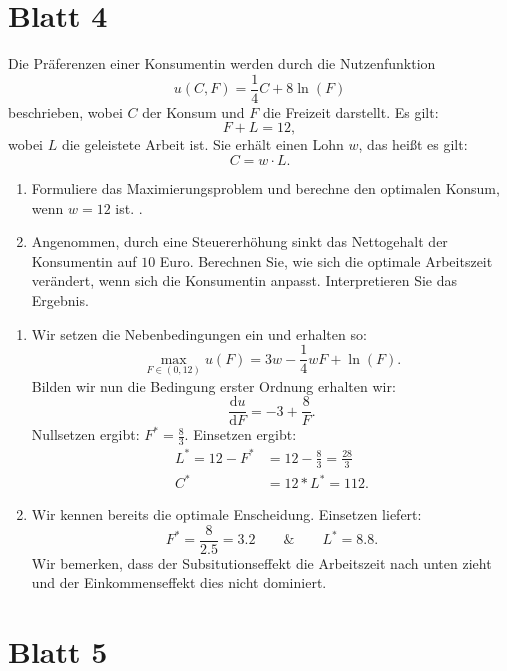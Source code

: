 \section{Blatt 4}

\begin{question}

	Die Präferenzen einer Konsumentin werden durch die Nutzenfunktion
	\[
		u(C,F) = \frac{1}{4} C +8 \ln(F)
	\]
	beschrieben, wobei $C$ der Konsum und $F$ die Freizeit darstellt.
	Es gilt:
	\[
		F+L = 12
		,\]
	wobei $L$ die geleistete Arbeit ist. Sie erhält einen Lohn $w$, das heißt es gilt:
	\[
		C = w \cdot L
		.\]
	\begin{enumerate}
		\item Formuliere das Maximierungsproblem und berechne den optimalen Konsum, wenn $w=12$ ist. .
		\item Angenommen, durch eine Steuererhöhung sinkt das Nettogehalt der Konsumentin auf
		      $10$ Euro. Berechnen Sie, wie sich die optimale Arbeitszeit verändert, wenn sich die Konsumentin anpasst. Interpretieren Sie das Ergebnis.
	\end{enumerate}
\end{question}

\begin{solution}

	\begin{enumerate}
		\item Wir setzen die Nebenbedingungen ein und erhalten so:
		      \[
			      \max_{F \in (0,12)} u(F) = 3w- \frac{1}{4} w F + \ln(F)
			      .\]
		      Bilden wir nun die Bedingung erster Ordnung erhalten wir:
		      \[
			      \frac{\mathrm{d} u}{\mathrm{d} F} = -3 + \frac{8}{F}
			      .\]
		      Nullsetzen ergibt: $F^* = \frac{8}{3}$. Einsetzen ergibt:
		      \begin{align*}
			      L^* = 12 - F^* & = 12 - \frac{8}{3} = \frac{28}{3} \\
			      C^*            & = 12* L^* = 112
			      .\end{align*}
		\item Wir kennen bereits die optimale Enscheidung. Einsetzen liefert:
		      \[
			      F^* = \frac{8}{2.5} = 3.2 \qquad \& \qquad L^* = 8.8
			      .\]
		      Wir bemerken, dass der Subsitutionseffekt die Arbeitszeit nach unten zieht und der Einkommenseffekt dies nicht dominiert.
	\end{enumerate}
\end{solution}

\section{Blatt 5}


